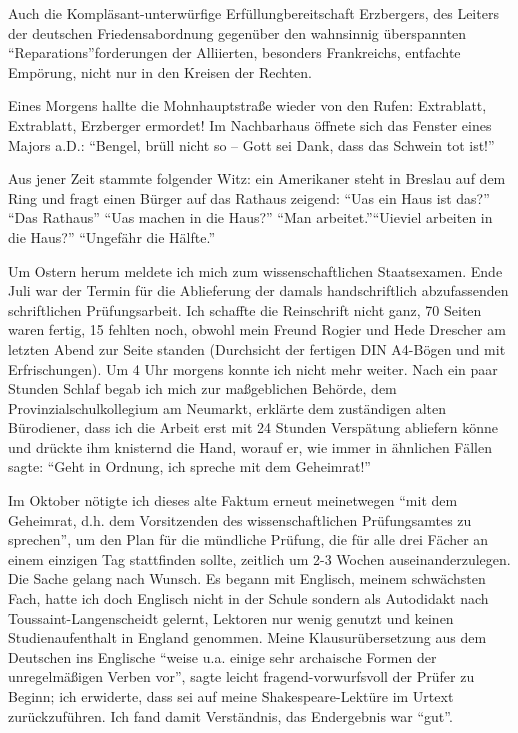 Auch die Kompläsant-unterwürfige Erfüllungbereitschaft Erzbergers, des Leiters der deutschen Friedensabordnung gegenüber den wahnsinnig überspannten \enquote{Reparations}forderungen der Alliierten, besonders Frankreichs, entfachte Empörung, nicht nur in den Kreisen der Rechten.

Eines Morgens hallte die Mohnhauptstraße wieder von den Rufen: Extrablatt, Extrablatt, Erzberger ermordet! Im Nachbarhaus öffnete sich das Fenster eines Majors a.D.: \enquote{Bengel, brüll nicht so -- Gott sei Dank, dass das Schwein tot ist!}

Aus jener Zeit stammte folgender Witz: ein Amerikaner steht in Breslau auf dem Ring und fragt einen Bürger auf das Rathaus zeigend: \enquote{Uas ein Haus ist das?} \enquote{Das Rathaus} \enquote{Uas machen in die Haus?} \enquote{Man arbeitet.}\enquote{Uieviel arbeiten in die Haus?} \enquote{Ungefähr die Hälfte.}

Um Ostern herum meldete ich mich zum wissenschaftlichen Staatsexamen. Ende Juli war der Termin für die Ablieferung der damals handschriftlich abzufassenden schriftlichen Prüfungsarbeit. Ich schaffte die Reinschrift nicht ganz, 70 Seiten waren fertig, 15 fehlten noch, obwohl mein Freund Rogier und Hede Drescher am letzten Abend zur Seite standen (Durchsicht der fertigen DIN A4-Bögen und mit Erfrischungen). Um 4 Uhr morgens konnte ich nicht mehr weiter. Nach ein paar Stunden Schlaf begab ich mich zur maßgeblichen Behörde, dem Provinzialschulkollegium am Neumarkt, erklärte dem zuständigen alten Bürodiener, dass ich die Arbeit erst mit 24 Stunden Verspätung abliefern könne und drückte ihm knisternd die Hand, worauf er, wie immer in ähnlichen Fällen sagte: \enquote{Geht in Ordnung, ich spreche mit dem Geheimrat!}

Im Oktober nötigte ich dieses alte Faktum erneut meinetwegen \enquote{mit dem Geheimrat, d.h. dem Vorsitzenden des wissenschaftlichen Prüfungsamtes zu sprechen}, um den Plan für die mündliche Prüfung, die für alle drei Fächer an einem einzigen Tag stattfinden sollte, zeitlich um 2-3 Wochen auseinanderzulegen. Die Sache gelang nach Wunsch. Es begann mit Englisch, meinem schwächsten Fach, hatte ich doch Englisch nicht in der Schule sondern als Autodidakt nach Toussaint-Langenscheidt gelernt, Lektoren nur wenig genutzt und keinen Studienaufenthalt in England genommen. Meine Klausurübersetzung aus dem Deutschen ins Englische \enquote{weise u.a. einige sehr archaische Formen der unregelmäßigen Verben vor}, sagte leicht fragend-vorwurfsvoll der Prüfer zu Beginn; ich erwiderte, dass sei auf meine Shakespeare-Lektüre im Urtext zurückzuführen. Ich fand damit Verständnis, das Endergebnis war \enquote{gut}.

